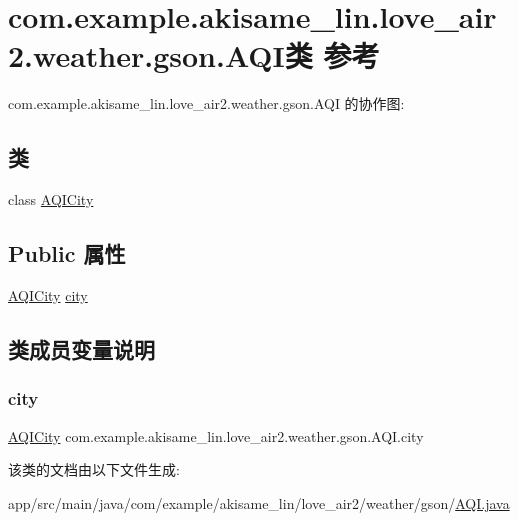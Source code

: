 \hypertarget{classcom_1_1example_1_1akisame__lin_1_1love__air2_1_1weather_1_1gson_1_1_a_q_i}{}\section{com.\+example.\+akisame\+\_\+lin.\+love\+\_\+air2.\+weather.\+gson.\+A\+Q\+I类 参考}
\label{classcom_1_1example_1_1akisame__lin_1_1love__air2_1_1weather_1_1gson_1_1_a_q_i}


com.\+example.\+akisame\+\_\+lin.\+love\+\_\+air2.\+weather.\+gson.\+A\+QI 的协作图\+:
\subsection*{类}
\begin{DoxyCompactItemize}
\item 
class \mbox{\hyperlink{classcom_1_1example_1_1akisame__lin_1_1love__air2_1_1weather_1_1gson_1_1_a_q_i_1_1_a_q_i_city}{A\+Q\+I\+City}}
\end{DoxyCompactItemize}
\subsection*{Public 属性}
\begin{DoxyCompactItemize}
\item 
\mbox{\hyperlink{classcom_1_1example_1_1akisame__lin_1_1love__air2_1_1weather_1_1gson_1_1_a_q_i_1_1_a_q_i_city}{A\+Q\+I\+City}} \mbox{\hyperlink{classcom_1_1example_1_1akisame__lin_1_1love__air2_1_1weather_1_1gson_1_1_a_q_i_a081e5bb3e642f2638411616f2cf9c05c}{city}}
\end{DoxyCompactItemize}


\subsection{类成员变量说明}
\mbox{\label{classcom_1_1example_1_1akisame__lin_1_1love__air2_1_1weather_1_1gson_1_1_a_q_i_a081e5bb3e642f2638411616f2cf9c05c}} 
\subsubsection{\texorpdfstring{city}{city}}
{\footnotesize\ttfamily \mbox{\hyperlink{classcom_1_1example_1_1akisame__lin_1_1love__air2_1_1weather_1_1gson_1_1_a_q_i_1_1_a_q_i_city}{A\+Q\+I\+City}} com.\+example.\+akisame\+\_\+lin.\+love\+\_\+air2.\+weather.\+gson.\+A\+Q\+I.\+city}



该类的文档由以下文件生成\+:\begin{DoxyCompactItemize}
\item 
app/src/main/java/com/example/akisame\+\_\+lin/love\+\_\+air2/weather/gson/\mbox{\hyperlink{java_2com_2example_2akisame__lin_2love__air2_2weather_2gson_2_a_q_i_8java}{A\+Q\+I.\+java}}\end{DoxyCompactItemize}
